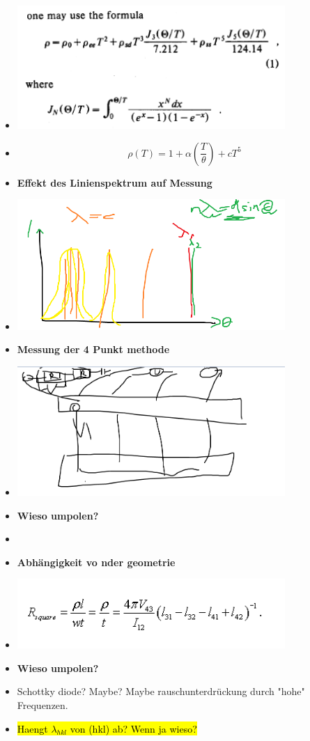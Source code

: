 \begin{itemize}
    \item \includegraphics[width=0.8\textwidth]{images/copperwut.PNG}
    \item $$\rho(T) = 1 + \alpha(\frac{T}{\theta}) + cT^5$$
    \item \textbf{Effekt des Linienspektrum auf Messung}
    \item \includegraphics[width=0.8\textwidth]{images/linienspeckie.PNG}
    \item \textbf{Messung der 4 Punkt methode}
    \item \includegraphics[width=0.8\textwidth]{images/4pointstyle.PNG}
    \item \textbf{Wieso umpolen?}
    \item %
    \item \textbf{Abhängigkeit vo nder geometrie}
    \item \includegraphics[width=0.8\textwidth]{images/geom.PNG}
    \item \textbf{Wieso umpolen?}
    \item Schottky diode? Maybe? Maybe rauschunterdrückung durch "hohe" Frequenzen.
\end{itemize}

\begin{itemize}
    \item \hl{Haengt $\lambda_{hkl}$ von (hkl) ab? Wenn ja wieso?}
\end{itemize}